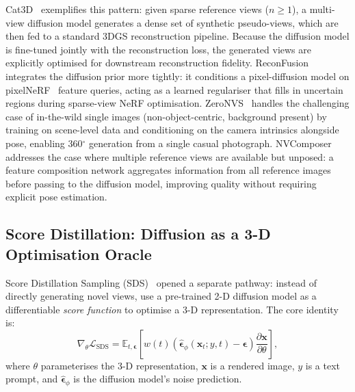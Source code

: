 Cat3D~\citep{gao2024cat3d} exemplifies this pattern: given sparse reference
views ($n\geq1$), a multi-view diffusion model generates a dense set of
synthetic pseudo-views, which are then fed to a standard 3DGS reconstruction
pipeline.
Because the diffusion model is fine-tuned jointly with the reconstruction loss,
the generated views are explicitly optimised for downstream reconstruction fidelity.
ReconFusion~\citep{wu2024reconfusion} integrates the diffusion prior more tightly:
it conditions a pixel-diffusion model on pixelNeRF~\citep{yu2021pixelnerf}
feature queries, acting as a learned regulariser that fills in uncertain regions
during sparse-view NeRF optimisation.
ZeroNVS~\citep{sargent2023zeronvs} handles the challenging case of
in-the-wild single images (non-object-centric, background present) by training
on scene-level data and conditioning on the camera intrinsics alongside pose,
enabling 360$^\circ$ generation from a single casual photograph.
NVComposer~\citep{li2024nvcomposer} addresses the case where multiple reference
views are available but unposed: a feature composition network aggregates
information from all reference images before passing to the diffusion model,
improving quality without requiring explicit pose estimation.

\subsection{Score Distillation: Diffusion as a 3-D Optimisation Oracle}

Score Distillation Sampling (SDS)~\citep{poole2023dreamfusion} opened a
separate pathway: instead of directly generating novel views, use a
pre-trained 2-D diffusion model as a differentiable \emph{score function}
to optimise a 3-D representation.
The core identity is:
\begin{equation}
  \nabla_\theta \mathcal{L}_\text{SDS}
  = \mathbb{E}_{t,\boldsymbol{\epsilon}}\!\left[
    w(t)\!\left(
      \hat{\boldsymbol{\epsilon}}_\phi(\mathbf{x}_t; y, t)
      - \boldsymbol{\epsilon}
    \right)\frac{\partial \mathbf{x}}{\partial \theta}
  \right],
  \label{eq:sds}
\end{equation}
where $\theta$ parameterises the 3-D representation, $\mathbf{x}$ is a rendered
image, $y$ is a text prompt, and $\hat{\boldsymbol{\epsilon}}_\phi$ is the
diffusion model's noise prediction.

